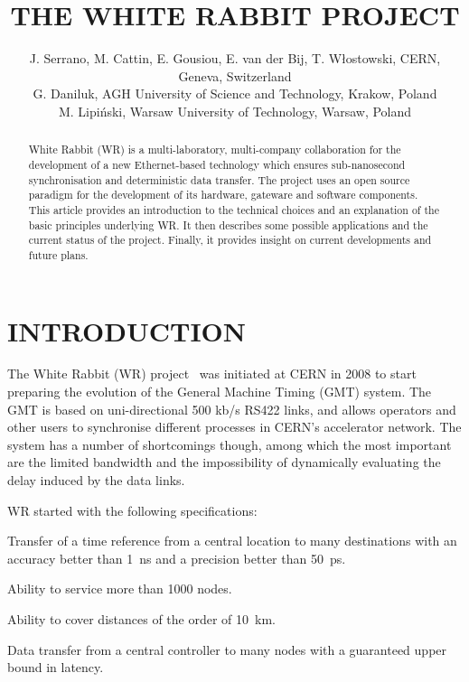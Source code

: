 \documentclass{../JAC2003}
\begin{document}
\title{THE WHITE RABBIT PROJECT}

\author{J. Serrano, M. Cattin, E. Gousiou, E. van der Bij,
  T. W\l{}ostowski, CERN, Geneva, Switzerland\\
  G. Daniluk, AGH University of Science and Technology, Krakow, Poland\\
  M. Lipi\'{n}ski, Warsaw University of Technology, Warsaw, Poland}

\maketitle

\begin{abstract}

  White Rabbit (WR) is a multi-laboratory, multi-company collaboration
  for the development of a new Ethernet-based technology which ensures
  sub-nanosecond synchronisation and deterministic data transfer. The
  project uses an open source paradigm for the development of its
  hardware, gateware and software components. This article provides an
  introduction to the technical choices and an explanation of the
  basic principles underlying WR. It then describes some possible
  applications and the current status of the project. Finally, it
  provides insight on current developments and future plans.

\end{abstract}

\section{INTRODUCTION}

The White Rabbit (WR) project~\cite{white-rabbit-ref} was initiated at
CERN in 2008 to start preparing the evolution of the General Machine
Timing (GMT) system. The GMT is based on uni-directional 500 kb/s
RS422 links, and allows operators and other users to synchronise
different processes in CERN's accelerator network. The system has a
number of shortcomings though, among which the most important are the
limited bandwidth and the impossibility of dynamically evaluating the
delay induced by the data links.

WR started with the following specifications:
\begin{Itemize}
 \item Transfer of a time reference from a central location to many
   destinations with an accuracy better than 1~ns and a precision
   better than 50~ps.
 \item Ability to service more than 1000 nodes.
 \item Ability to cover distances of the order of 10~km.
 \item Data transfer from a central controller to many nodes with a
   guaranteed upper bound in latency.
\end{Itemize}
\end{document}
